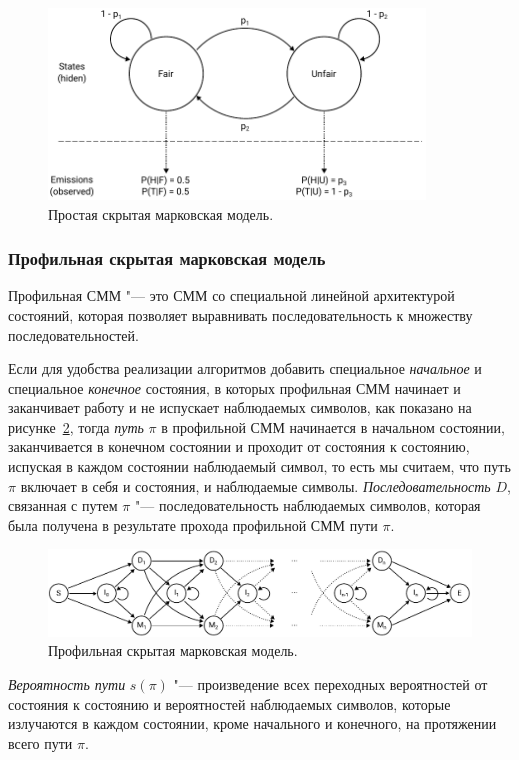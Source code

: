 \documentclass[specialist,
substylefile = spbu_report.rtx,
subf,href,colorlinks=true, 12pt]{disser}
\begin{document}
			\begin{figure}[h]
				\includegraphics[width=10cm]{figure1}
				\centering
				\caption{Простая скрытая марковская модель.} \label{fg:2}
			\end{figure}
		
			\subsubsection{Профильная скрытая марковская модель}
			Профильная СММ "--- это СММ со специальной линейной архитектурой состояний, которая позволяет выравнивать последовательность к множеству последовательностей.						
									
			Если для удобства реализации алгоритмов добавить специальное \textit{начальное} и специальное \textit{конечное} состояния, в которых профильная СММ начинает и заканчивает работу и не испускает наблюдаемых символов, как показано на рисунке~\ref{fg:3}, тогда \textit{путь} $\pi$ в профильной СММ начинается в начальном состоянии, заканчивается в конечном состоянии и проходит от состояния к состоянию, испуская в каждом состоянии наблюдаемый символ, то есть мы считаем, что путь $\pi$ включает в себя и состояния, и наблюдаемые символы. \textit{Последовательность} $D$, связанная с путем $\pi$ "--- последовательность наблюдаемых символов, которая была получена в результате прохода профильной СММ пути $\pi$. 
			
			\begin{figure}[h]
				\includegraphics[width=15cm]{figure2}
				\centering
				\caption{Профильная скрытая марковская модель.}  \label{fg:3}
			\end{figure}
						
			\textit{Вероятность пути} $s(\pi)$ "--- произведение всех переходных вероятностей от состояния к состоянию и вероятностей наблюдаемых символов, которые излучаются в каждом состоянии, кроме начального и конечного, на протяжении всего пути $\pi$. 
			
\end{document}
